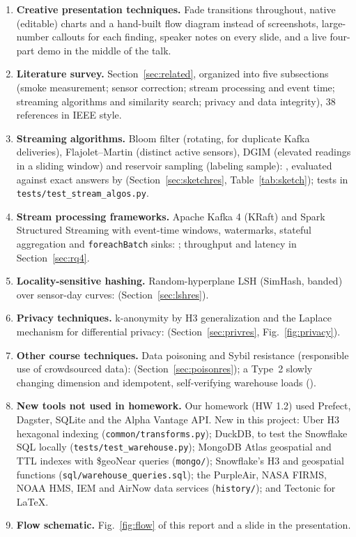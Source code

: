 \begin{enumerate}
\item \textbf{Creative presentation techniques.} Fade transitions throughout, native (editable) charts and a hand-built flow diagram instead of screenshots, large-number callouts for each finding, speaker notes on every slide, and a live four-part demo in the middle of the talk.

\item \textbf{Literature survey.} Section~\ref{sec:related}, organized into five subsections (smoke measurement; sensor correction; stream processing and event time; streaming algorithms and similarity search; privacy and data integrity), 38 references in IEEE style.

\item \textbf{Streaming algorithms.} Bloom filter (rotating, for duplicate Kafka deliveries), Flajolet--Martin (distinct active sensors), DGIM (elevated readings in a sliding window) and reservoir sampling (labeling sample): , evaluated against exact answers by  (Section~\ref{sec:sketchres}, Table~\ref{tab:sketch}); tests in \texttt{tests/test\_stream\_algos.py}.

\item \textbf{Stream processing frameworks.} Apache Kafka 4 (KRaft) and Spark Structured Streaming with event-time windows, watermarks, stateful aggregation and \texttt{foreachBatch} sinks: ; throughput and latency in Section~\ref{sec:rq4}.

\item \textbf{Locality-sensitive hashing.} Random-hyperplane LSH (SimHash, banded) over sensor-day curves:  (Section~\ref{sec:lshres}).

\item \textbf{Privacy techniques.} k-anonymity by H3 generalization and the Laplace mechanism for differential privacy:  (Section~\ref{sec:privres}, Fig.~\ref{fig:privacy}).

\item \textbf{Other course techniques.} Data poisoning and Sybil resistance (responsible use of crowdsourced data):  (Section~\ref{sec:poisonres}); a Type~2 slowly changing dimension and idempotent, self-verifying warehouse loads ().

\item \textbf{New tools not used in homework.} Our homework (HW 1.2) used Prefect, Dagster, SQLite and the Alpha Vantage API. New in this project: Uber H3 hexagonal indexing (\texttt{common/transforms.py}); DuckDB, to test the Snowflake SQL locally (\texttt{tests/test\_warehouse.py}); MongoDB Atlas geospatial and TTL indexes with \$geoNear queries (\texttt{mongo/}); Snowflake's H3 and geospatial functions (\texttt{sql/warehouse\_queries.sql}); the PurpleAir, NASA FIRMS, NOAA HMS, IEM and AirNow data services (\texttt{history/}); and Tectonic for LaTeX.

\item \textbf{Flow schematic.} Fig.~\ref{fig:flow} of this report and a slide in the presentation.
\end{enumerate}

